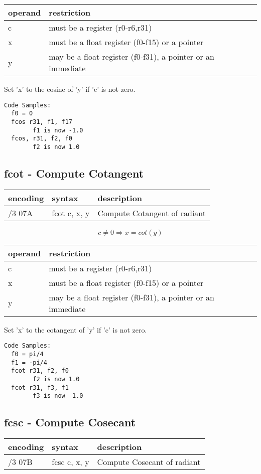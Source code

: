 \documentclass[letterpaper,10pt,openright,twoside,onecolumn]{book}
\begin{document}
  \flushleft
  \begin{tabular}{|l|l|}
   \hline
    operand & restriction \\
   \hline
    c & must be a register (r0-r6,r31) \\
    x & must be a float register (f0-f15) or a pointer \\
    y & may be a float register (f0-f31), a pointer or an immediate \\
  \hline
  \end{tabular}

  Set 'x' to the cosine of 'y' if 'c' is not zero.

  \begin{verbatim}
Code Samples:
  f0 = 0
  fcos r31, f1, f17
        f1 is now -1.0
  fcos, r31, f2, f0
        f2 is now 1.0
  \end{verbatim}
\newpage\subsection{fcot - Compute Cotangent}
  \begin{tabular}{|l|l|l|}
   \hline
    encoding & syntax & description \\
   \hline
    /3 07A & fcot c, x, y & Compute Cotangent of radiant\\
   \hline
  \end{tabular}

  \begin{displaymath} c \neq 0 \Rightarrow x = cot(y)\end{displaymath}

  \flushleft
  \begin{tabular}{|l|l|}
   \hline
    operand & restriction \\
   \hline
    c & must be a register (r0-r6,r31) \\
    x & must be a float register (f0-f15) or a pointer \\
    y & may be a float register (f0-f31), a pointer or an immediate \\
  \hline
  \end{tabular}

  Set 'x' to the cotangent of 'y' if 'c' is not zero.

  \begin{verbatim}
Code Samples:
  f0 = pi/4
  f1 = -pi/4
  fcot r31, f2, f0
        f2 is now 1.0
  fcot r31, f3, f1
        f3 is now -1.0
  \end{verbatim}
\newpage\subsection{fcsc - Compute Cosecant}
  \begin{tabular}{|l|l|l|}
   \hline
    encoding & syntax & description \\
   \hline
    /3 07B & fcsc c, x, y & Compute Cosecant of radiant\\
   \hline
  \end{tabular}
\end{document}

